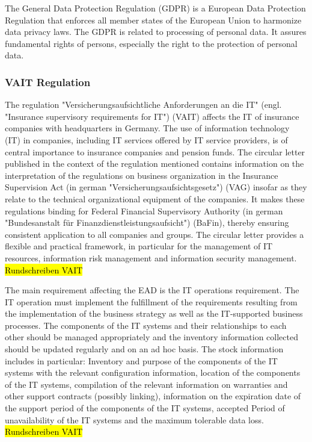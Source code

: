 The General Data Protection Regulation (GDPR) is a European Data Protection Regulation that enforces all member states of the European Union to harmonize data privacy laws. The GDPR is related to processing of personal data. It assures fundamental rights of  persons, especially the right to the protection of personal data.

\subsubsection{VAIT Regulation}

The regulation "Versicherungsaufsichtliche Anforderungen an die IT" (engl. "Insurance supervisory requirements for IT") (VAIT) affects the IT of insurance companies with headquarters in Germany. The use of information technology (IT) in companies, including IT services offered by IT service providers, is of central importance to insurance companies and pension funds. The circular letter published in the context of the regulation mentioned contains information on the interpretation of the regulations on business organization in the Insurance Supervision Act  (in german "Versicherungsaufsichtsgesetz") (VAG) insofar as they relate to the technical organizational equipment of the companies. It makes these regulations binding for Federal Financial Supervisory Authority (in german "Bundesanstalt für Finanzdienstleistungsaufsicht") (BaFin), thereby ensuring consistent application to all companies and groups. The circular letter provides a flexible and practical framework, in particular for the management of IT resources, information risk management and information security management. \hl{Rundschreiben VAIT}

The main requirement affecting the EAD is the IT operations requirement. The IT operation must implement the fulfillment of the requirements resulting from the implementation of the business strategy as well as the IT-supported business processes. The components of the IT systems and their relationships to each other should be managed appropriately and the inventory information collected should be updated regularly and on an ad hoc basis. The stock information includes in particular: Inventory and purpose of the components of the IT systems with the relevant configuration information, location of the components of the IT systems, compilation of the relevant information on warranties and other support contracts (possibly linking), information on the expiration date of the support period of the components of the IT systems, accepted Period of unavailability of the IT systems and the maximum tolerable data loss. \hl{Rundschreiben VAIT}

